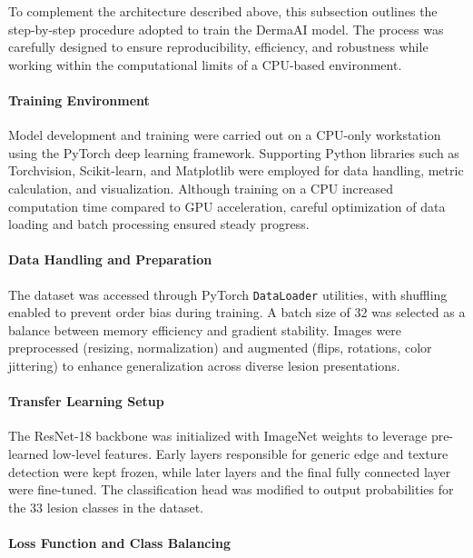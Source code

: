 \documentclass[
  12pt,
  oneside]{article}
\begin{document}
To complement the architecture described above, this subsection outlines
the step-by-step procedure adopted to train the DermaAI model. The
process was carefully designed to ensure reproducibility, efficiency,
and robustness while working within the computational limits of a
CPU-based environment.

\paragraph{Training Environment}\label{training-environment}

Model development and training were carried out on a CPU-only
workstation using the PyTorch deep learning framework. Supporting Python
libraries such as Torchvision, Scikit-learn, and Matplotlib were
employed for data handling, metric calculation, and visualization.
Although training on a CPU increased computation time compared to GPU
acceleration, careful optimization of data loading and batch processing
ensured steady progress.

\paragraph{Data Handling and
Preparation}\label{data-handling-and-preparation}

The dataset was accessed through PyTorch \texttt{DataLoader} utilities,
with shuffling enabled to prevent order bias during training. A batch
size of 32 was selected as a balance between memory efficiency and
gradient stability. Images were preprocessed (resizing, normalization)
and augmented (flips, rotations, color jittering) to enhance
generalization across diverse lesion presentations.

\paragraph{Transfer Learning Setup}\label{transfer-learning-setup}

The ResNet-18 backbone was initialized with ImageNet weights to leverage
pre-learned low-level features. Early layers responsible for generic
edge and texture detection were kept frozen, while later layers and the
final fully connected layer were fine-tuned. The classification head was
modified to output probabilities for the 33 lesion classes in the
dataset.

\paragraph{Loss Function and Class
Balancing}\label{loss-function-and-class-balancing-2}
\end{document}
